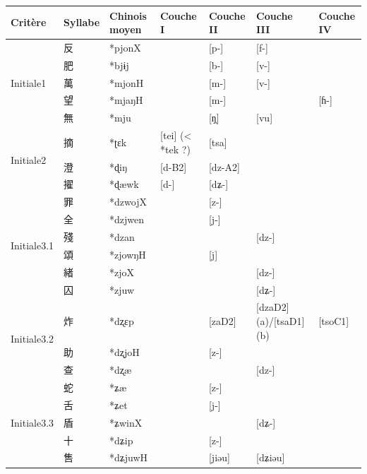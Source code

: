 \documentclass{scrbook}
\newcounter{c}[subsubsection]
\begin{document}
\begin{sloppypar}
\begin{landscape}
\begin{longtable}[htbp]{lllllll}
    \toprule
    Critère & Syllabe & Chinois moyen  & \multicolumn{1}{l}{Couche I} & Couche II & Couche III & \multicolumn{1}{l}{Couche IV} \\
    \midrule
    \multirow{5}[2]{*}{Initiale1} & 反     & *pjonX &       & [p-]  & [f-]  &  \\
          & 肥     & *bjɨj &       & [b-]  & [v-]  &  \\
          & 萬     & *mjonH &       & [m-]  & [v-]  &  \\
          & 望     & *mjaŋH &       & [m-]  &       & \multicolumn{1}{l}{[ɦ-]} \\
          & 無     & *mju  &       & [ŋ̩]  & [vu]  &  \\
    \midrule
    \multirow{3}[2]{*}{Initiale2} & 摘     & *ʈɛk  & \multicolumn{1}{l}{[tei] (< *tek ?)} & [tsa] &       &  \\
          & 澄     & *ɖiŋ  & \multicolumn{1}{l}{[d-B2]} & [dz-A2] &       &  \\
          & 擢     & *ɖæwk & \multicolumn{1}{l}{[d-]} & [dʑ-] &       &  \\
    \midrule
    \multirow{6}[2]{*}{Initiale3.1} & 罪     & *dzwojX &       & [z-]  &       &  \\
          & 全     & *dzjwen &       & [j-]  &       &  \\
          & 殘     & *dzan &       &       & [dz-] &  \\
          & 頌     & *zjowŋH &       & [j]   &       &  \\
          & 緒     & *zjoX &       &       & [dz-] &  \\
          & 囚     & *zjuw &       &       & [dʑ-] &  \\
    \midrule
    \multirow{3}[2]{*}{Initiale3.2} & 炸     & *dʐɛp &       & [zaD2] & [dzaD2] (a)/[tsaD1] (b) & \multicolumn{1}{l}{[tsoC1]} \\
          & 助     & *dʐjoH &       & [z-]  &       &  \\
          & 查     & *dʐæ  &       &       & [dz-] &  \\
    \midrule
    \multirow{6}[2]{*}{Initiale3.3} & 蛇     & *ʑæ   &       & [z-]  &       &  \\
          & 舌     & *ʑet  &       & [j-]  &       &  \\
          & 盾     & *ʑwinX &       &       & [dʑ-] &  \\
          & 十     & *dʑip &       & [z-]  &       &  \\
          & 售     & *dʑjuwH &       & [jiəu] & [dʑiəu] &  \\

\end{longtable}
\end{landscape}
\end{sloppypar}
\end{document}
